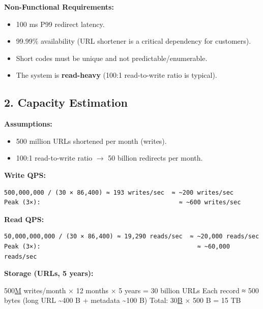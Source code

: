 \documentclass[11pt]{article}
\providecommand{\tightlist}{\setlength{\itemsep}{1pt}\setlength{\parskip}{0pt}}
\newenvironment{Shaded}{\begin{snugshade}}{\end{snugshade}}
\newcommand{\BuiltInTok}[1]{\textcolor[rgb]{0.50,0.55,0.55}{#1}}
\newcommand{\DecValTok}[1]{\textcolor[rgb]{0.96,0.45,0.00}{#1}}
\newcommand{\ErrorTok}[1]{\textcolor[rgb]{0.85,0.27,0.33}{\underline{#1}}}
\newcommand{\NormalTok}[1]{\textcolor[rgb]{0.81,0.81,0.76}{#1}}
\newcommand{\OperatorTok}[1]{\textcolor[rgb]{0.81,0.81,0.76}{#1}}
\begin{document}
\textbf{Non-Functional Requirements:}

\begin{itemize}
\tightlist
\item
  100 ms P99 redirect latency.
\item
  99.99\% availability (URL shortener is a critical dependency for customers).
\item
  Short codes must be unique and not predictable/enumerable.
\item
  The system is \textbf{read-heavy} (100:1 read-to-write ratio is typical).
\end{itemize}

\subsection{2. Capacity Estimation}\label{2-capacity-estimation}

\textbf{Assumptions:}

\begin{itemize}
\tightlist
\item
  500 million URLs shortened per month (writes).
\item
  100:1 read-to-write ratio \(\rightarrow\) 50 billion redirects per month.
\end{itemize}

\textbf{Write QPS:}

\setcodelang{}

\begin{verbatim}
500,000,000 / (30 × 86,400) ≈ 193 writes/sec  ≈ ~200 writes/sec
Peak (3×):                                      ≈ ~600 writes/sec
\end{verbatim}

\textbf{Read QPS:}

\setcodelang{}

\begin{verbatim}
50,000,000,000 / (30 × 86,400) ≈ 19,290 reads/sec  ≈ ~20,000 reads/sec
Peak (3×):                                           ≈ ~60,000 reads/sec
\end{verbatim}

\textbf{Storage (URLs, 5 years):}


\begin{Shaded}
\begin{Highlighting}[]
\DecValTok{500}\ErrorTok{M}\NormalTok{ writes}\OperatorTok{/}\NormalTok{month × }\DecValTok{12}\NormalTok{ months × }\DecValTok{5}\NormalTok{ years }\OperatorTok{=} \DecValTok{30}\NormalTok{ billion URLs}
\NormalTok{Each record ≈ }\DecValTok{500} \BuiltInTok{bytes}\NormalTok{ (}\BuiltInTok{long}\NormalTok{ URL }\OperatorTok{\textasciitilde{}}\DecValTok{400}\NormalTok{ B }\OperatorTok{+}\NormalTok{ metadata }\OperatorTok{\textasciitilde{}}\DecValTok{100}\NormalTok{ B)}
\NormalTok{Total: }\DecValTok{30}\ErrorTok{B}\NormalTok{ × }\DecValTok{500}\NormalTok{ B }\OperatorTok{=} \DecValTok{15}\NormalTok{ TB}
\end{Highlighting}
\end{Shaded}
\end{document}
